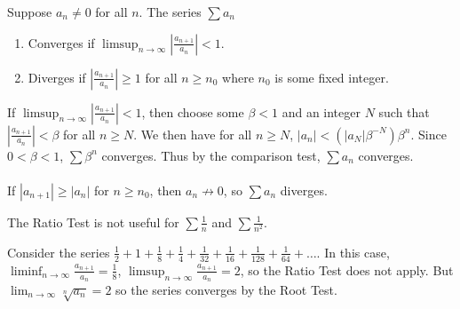 \documentclass{mathnotes}
\begin{document}
\begin{thm}
  Suppose $a_n\neq0$ for all $n$. The series $\sum a_n$
  \begin{enumerate}
    \item Converges if $\limsup_{n\to\infty}|\frac{a_{n+1}}{a_n}|<1$.
    \item Diverges if $|\frac{a_{n+1}}{a_n}|\ge1$ for all $n\ge n_0$ where
      $n_0$ is some fixed integer.
  \end{enumerate}
\end{thm}

\begin{pf}
  If $\limsup_{n\to\infty}|\frac{a_{n+1}}{a_n}|<1$, then choose some $\beta<1$
  and an integer $N$ such that $|\frac{a_{n+1}}{a_n}|<\beta$ for all $n\ge N$.
  We then have for all $n\ge N$, $|a_n|<(|a_N|\beta^{-N})\beta^n$. Since
  $0<\beta<1$, $\sum\beta^n$ converges. Thus by the comparison test, $\sum a_n$
  converges.\\\\
  If $|a_{n+1}|\ge|a_n|$ for $n\ge n_0$, then $a_n\not\to0$, so $\sum a_n$
  diverges.
\end{pf}

\begin{note}
  The Ratio Test is not useful for $\sum\frac{1}{n}$ and $\sum\frac{1}{n^2}$.
\end{note}

\begin{ex}
  Consider the series $\frac{1}{2}+1+\frac{1}{8}+\frac{1}{4}+\frac{1}{32}
  +\frac{1}{16}+\frac{1}{128}+\frac{1}{64}+\ldots$. In this case,
  $\liminf_{n\to\infty}\frac{a_{n+1}}{a_n}=\frac{1}{8}$,
  $\limsup_{n\to\infty}\frac{a_{n+1}}{a_n}=2$, so the Ratio Test does not
  apply. But $\lim_{n\to\infty}\sqrt[n]{a_n}=2$ so the series converges by the
  Root Test.
\end{ex}
\end{document}
